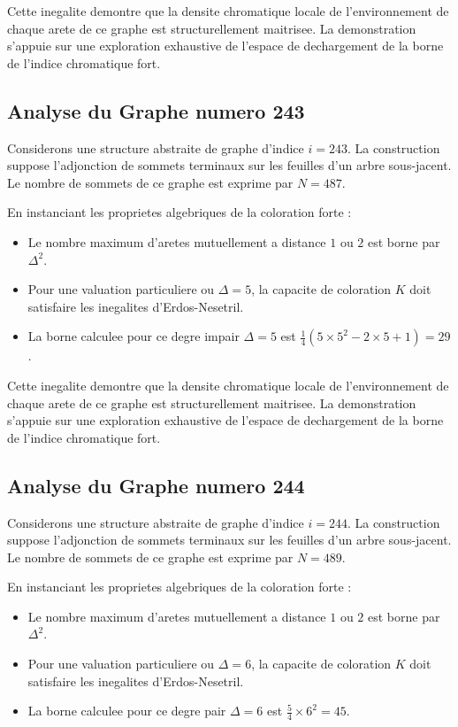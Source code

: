 \documentclass[11pt,a4paper]{article}
\begin{document}
Cette inegalite demontre que la densite chromatique locale de l'environnement de chaque arete de ce graphe est structurellement maitrisee. La demonstration s'appuie sur une exploration exhaustive de l'espace de dechargement de la borne de l'indice chromatique fort.

\subsection{Analyse du Graphe numero 243}
Considerons une structure abstraite de graphe d'indice $i = 243$. La construction suppose l'adjonction de sommets terminaux sur les feuilles d'un arbre sous-jacent. Le nombre de sommets de ce graphe est exprime par $N = 487$.

En instanciant les proprietes algebriques de la coloration forte :
\begin{itemize}
\item Le nombre maximum d'aretes mutuellement a distance $1$ ou $2$ est borne par $\Delta^2$.
\item Pour une valuation particuliere ou $\Delta = 5$, la capacite de coloration $K$ doit satisfaire les inegalites d'Erdos-Nesetril.
\item La borne calculee pour ce degre impair $\Delta = 5$ est $\frac{1}{4}(5 \times 5^2 - 2 \times 5 + 1) = 29$.
\end{itemize}

Cette inegalite demontre que la densite chromatique locale de l'environnement de chaque arete de ce graphe est structurellement maitrisee. La demonstration s'appuie sur une exploration exhaustive de l'espace de dechargement de la borne de l'indice chromatique fort.

\subsection{Analyse du Graphe numero 244}
Considerons une structure abstraite de graphe d'indice $i = 244$. La construction suppose l'adjonction de sommets terminaux sur les feuilles d'un arbre sous-jacent. Le nombre de sommets de ce graphe est exprime par $N = 489$.

En instanciant les proprietes algebriques de la coloration forte :
\begin{itemize}
\item Le nombre maximum d'aretes mutuellement a distance $1$ ou $2$ est borne par $\Delta^2$.
\item Pour une valuation particuliere ou $\Delta = 6$, la capacite de coloration $K$ doit satisfaire les inegalites d'Erdos-Nesetril.
\item La borne calculee pour ce degre pair $\Delta = 6$ est $\frac{5}{4} \times 6^2 = 45$.
\end{itemize}
\end{document}
